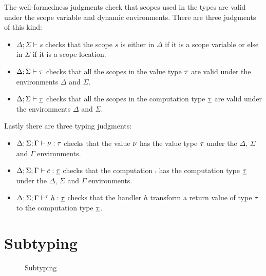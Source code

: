 {The well-formedness judgments check that scopes used in the types are valid under the scope variable and dynamic environments.
There are three judgments of this kind:
\begin{itemize}
\setlength\itemsep{0.5em}
\item $\Delta;\Sigma \vdash s$ checks that the scope $s$ is either in $\Delta$ if it is a scope variable or else in $\Sigma$ if it is a scope location.
\item $\Delta;\Sigma \vdash \tau$ checks that all the scopes in the value type $\tau$ are valid under the environments $\Delta$ and $\Sigma$.
\item $\Delta;\Sigma \vdash \underline{\tau}$ checks that all the scopes in the computation type $\underline{\tau}$ are valid under the environments $\Delta$ and $\Sigma$.
\end{itemize}

Lastly there are three typing judgments:
\begin{itemize}
\setlength\itemsep{0.5em}
\item $\Delta;\Sigma;\Gamma \vdash \nu : \tau$ checks that the value $\nu$ has the value type $\tau$ under the $\Delta$, $\Sigma$ and $\Gamma$ environments.
\item $\Delta;\Sigma;\Gamma \vdash c : \underline{\tau}$ checks that the computation $\comp$ has the computation type $\underline{\tau}$ under the $\Delta$, $\Sigma$ and $\Gamma$ environments.
\item $\Delta;\Sigma;\Gamma \vdash^{\tau} h : \underline{\tau}$ checks that the handler $h$ transform a return value of type $\tau$ to the computation type $\underline{\tau}$.
\end{itemize}

\section{Subtyping}
\label{sec:subtyping}

\begin{figure}[h]
\caption{Subtyping}
\centering
\fbox{
\begin{minipage}{14 cm}
\[
\inferrule{
}{
	\subty{ \tinst{s}{\eff} }{ \tinst{s}{\eff} } 
}\quad(\footnotesize\textsc{Sub-Inst})
\hspace{3em}
\mprset{vskip=0 ex}
\inferrule{
	\subty{\ty_2}{\ty_1} \\
	\subty{\cty_1}{\cty_2} \\
}{
	\subty{ \tarr{\ty_1}{\cty_1} }{ \tarr{\ty_2}{\cty_2} }
}\quad(\footnotesize\textsc{Sub-Arr})
\hspace{3em}
\mprset{vskip=0 ex}
\]
\[
\inferrule{
	\subty{ \cty_1 }{ \cty_2 }
}{
	\subty{ \tforall{s_{var}}{\cty_1} }{ \tforall{s_{var}}{\cty_2} }
}\quad(\footnotesize\textsc{Sub-Forall})
\hspace{3em}
\mprset{vskip=0 ex}
\inferrule{
	\subty{ \ty_1 }{ \ty_2 } \\
	r_1 \subseteq r_2
}{
	\subty{ \aty{\ty_1}{r_1} }{ \aty{\ty_2}{r_2} }
}\quad(\footnotesize\textsc{Sub-Annot})
\]
\label{fig:subtyping-calc}
\end{minipage}
}
\end{figure}

}
